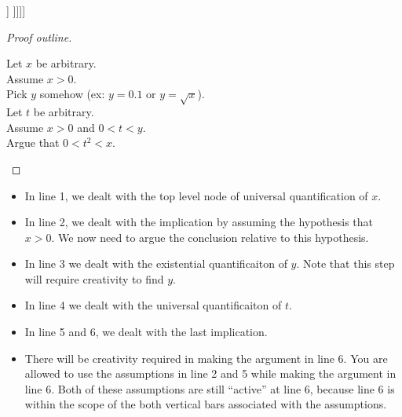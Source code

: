 \begin{center}
		\begin{forest}
				[$\forall x \in \mathbb{R}$ [$\implies$[$x>0$][ $\exists y \in \mathbb{R}$ [ $\forall t \in \mathbb{R}$ [$\implies$ [$0<t<y$][$0<t^2<x$]] ]]]]
			\end{forest}
	\end{center}

\begin{proof}[Proof outline]
	
				\leavevmode\newline
				
		\begin{fitch}
				\textrm{Let $x$ be arbitrary.}\\
				\textrm {Assume $x > 0$.}\\
				\fa \textrm{Pick $y$ somehow (ex:  $y = 0.1$ or $y = \sqrt{x}$)}.\\
				\fa \textrm{Let $t$ be arbitrary.}\\
				\fa \textrm{Assume $x>0$ and $0<t<y$}.\\
				\fa \fa \textrm{Argue that $0<t^2<x$.}
			\end{fitch}
		
	\end{proof}

\begin{itemize}
\item In line 1, we dealt with the top level node of universal quantification of $x$.
\item In line 2, we dealt with the implication by assuming the hypothesis that $x>0$.  We now need to argue the conclusion relative to this hypothesis.
\item In line 3 we dealt with the existential quantificaiton of $y$.  Note that this step will require creativity to find $y$.
\item In line 4 we dealt with the universal quantificaiton of $t$.
\item In line 5 and 6, we dealt with the last implication.
\item There will be creativity required in making the argument in line 6.  You are allowed to use the assumptions in line 2 and 5 while making the argument in line 6.  Both of these assumptions are still ``active'' at line 6, because line 6 is within the scope of the both vertical bars associated with the assumptions.
\end{itemize}

\newpage

